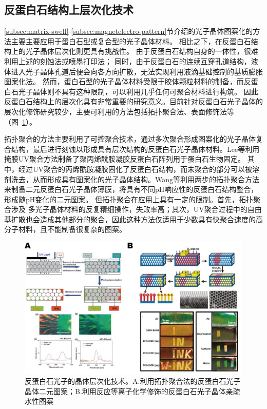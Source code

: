 \subsection{反蛋白石结构上层次化技术}
\label{subsec:inverse_opal_pattern}

\ref{subsec:matrix-swell}-\ref{subsec:magnetelectro-pattern}节介绍的光子晶体图案化的方法主要主要应用于蛋白石型或复合型的光子晶体材料。
相比之下，在反蛋白石结构上的光子晶体层次化则更具有挑战性。
由于反蛋白石结构自身的一体性，很难利用上述的刻蚀法或喷墨打印法；
同时，由于反蛋白石的连续互穿孔道结构，液体进入光子晶体孔道后便会向各方向扩散，无法实现利用液滴基础控制的基质膨胀图案化法。
然而，蛋白石型的光子晶体材料受限于胶体颗粒材料的制备，而反蛋白石光子晶体则不具有这种限制，可以利用几乎任何可聚合材料进行构筑。
因此反蛋白石结构上的层次化具有非常重要的研究意义。目前针对反蛋白石光子晶体的层次化修饰研究较少，主要可利用的方法包括拓扑聚合法、表面修饰法等（图~\ref{fig:inverse_opal_pattern}）。

拓扑聚合的方法主要利用了可控聚合技术，通过多次聚合形成图案化的光子晶体复合结构，最后进行刻蚀以形成具有层次结构的反蛋白石光子晶体材料。Lee等利用掩膜UV聚合方法制备了聚丙烯酰胺凝胶反蛋白石阵列用于蛋白石生物固定\cite{Lee2012Preparation}。
其中，经过UV聚合的丙烯酰胺凝胶固化了反蛋白石结构，而未聚合的部分可以被溶剂洗去，从而形成具有图案化的光子晶体结构。Wang等利用两步的拓扑聚合方法来制备二元反蛋白石光子晶体薄膜\cite{Wang2011Tuning}，将具有不同pH响应性的反蛋白石结构整合，形成随pH变化的二元图案。
但拓扑聚合在应用上具有一定的限制。首先，拓扑聚合涉及 多光子晶体材料的反复精细操作，失败率高；其次，UV聚合过程中的自由基扩散也会造成其他部分的聚合，因此这种方法仅适用于少数具有快聚合速度的高分子材料，且不能制备很复杂的图案。
\begin{figure}[htbp]
	\centering
	\includegraphics[width=0.9\linewidth]{figures/inverse_opal_pattern.png}
	\caption{反蛋白石光子的晶体层次化技术。A.利用拓扑聚合法的反蛋白石光子晶体二元图案\cite{Wang2011Tuning}；B.利用反应等离子化学修饰的反蛋白石光子晶体亲疏水性图案\cite{Burgess2012Encoding}}
	\label{fig:inverse_opal_pattern}
\end{figure}

